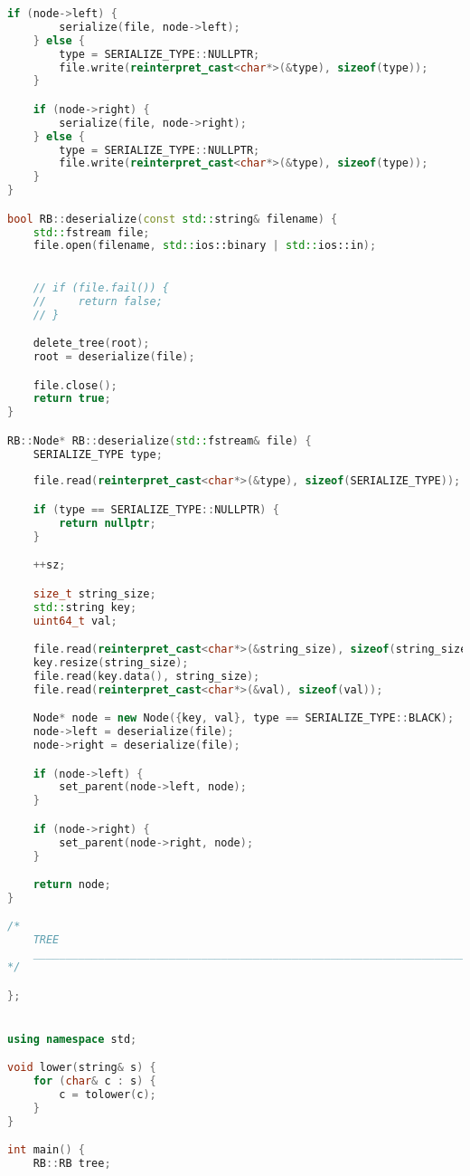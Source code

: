 \begin{lstlisting}[language=C++]
    if (node->left) {
        serialize(file, node->left);
    } else {
        type = SERIALIZE_TYPE::NULLPTR;
        file.write(reinterpret_cast<char*>(&type), sizeof(type));
    }

    if (node->right) {
        serialize(file, node->right);
    } else {
        type = SERIALIZE_TYPE::NULLPTR;
        file.write(reinterpret_cast<char*>(&type), sizeof(type));
    }
}

bool RB::deserialize(const std::string& filename) {
    std::fstream file;
    file.open(filename, std::ios::binary | std::ios::in);

    
    // if (file.fail()) {
    //     return false;
    // }

    delete_tree(root);
    root = deserialize(file);

    file.close();
    return true;
}

RB::Node* RB::deserialize(std::fstream& file) {
    SERIALIZE_TYPE type;
    
    file.read(reinterpret_cast<char*>(&type), sizeof(SERIALIZE_TYPE));

    if (type == SERIALIZE_TYPE::NULLPTR) {
        return nullptr;
    }

    ++sz;

    size_t string_size;
    std::string key;
    uint64_t val;

    file.read(reinterpret_cast<char*>(&string_size), sizeof(string_size));
    key.resize(string_size);
    file.read(key.data(), string_size);
    file.read(reinterpret_cast<char*>(&val), sizeof(val));

    Node* node = new Node({key, val}, type == SERIALIZE_TYPE::BLACK);
    node->left = deserialize(file);
    node->right = deserialize(file);

    if (node->left) {
        set_parent(node->left, node);
    }

    if (node->right) {
        set_parent(node->right, node);
    }

    return node;
}

/*
    TREE
    ______________________________________________________________________________________________________________________________________
*/

};


using namespace std;

void lower(string& s) {
    for (char& c : s) {
        c = tolower(c);
    }
}

int main() {
    RB::RB tree;


\end{lstlisting}
